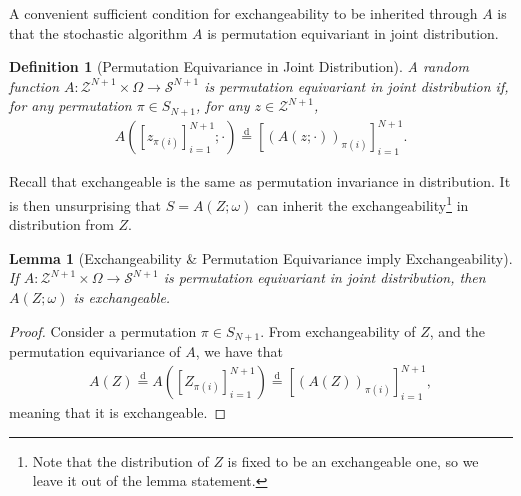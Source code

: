 \documentclass{article}
\newcommand{\oo}[1]{\left( #1 \right)}
\newcommand{\cc}[1]{\left[ #1 \right]}
\newtheorem{lemma}{Lemma}
\newtheorem{definition}{Definition}
\begin{document}
        A convenient sufficient condition for exchangeability to be inherited through $A$ is that the stochastic algorithm $A$ is permutation equivariant in joint distribution.
        \begin{definition}
            [Permutation Equivariance in Joint Distribution]
            \label{def:equivaraibt}
            A random function $A: \mathcal{Z}^{N+1} \times \Omega \to \mathcal{S}^{N+1}$ is permutation equivariant in joint distribution if, for any permutation $\pi \in S_{N+1}$, for any $z \in \mathcal{Z}^{N+1}$,
            \begin{align*}
                A\left(\left[z_{\pi(i)}\right]_{i=1}^{N+1}; \cdot\right)
                \overset{\text{d}}{=}
                \left[
                (A(z;\cdot))_{\pi(i)}
                \right]_{i=1}^{N+1}.
            \end{align*}
        \end{definition}
        Recall that exchangeable is the same as permutation invariance in distribution. It is then unsurprising that $S = A(Z;\omega)$ can inherit the exchangeability\footnote{Note that the distribution of $Z$ is fixed to be an exchangeable one, so we leave it out of the lemma statement.} in distribution from $Z$.
        \begin{lemma}
        [Exchangeability \& Permutation Equivariance imply Exchangeability]
        \label{lemma:exchange+equivariance}
            If $A: \mathcal{Z}^{N+1} \times \Omega \to \mathcal{S}^{N+1}$ is permutation equivariant in joint distribution, then $A(Z; \omega)$ is exchangeable.
        \end{lemma}
        \begin{proof}
            Consider a permutation $\pi \in S_{N+1}$. From exchangeability of $Z$, and the permutation equivariance of $A$, we have that
            \begin{align*}
                A(Z) \overset{\text{d}}{=}
                A\oo{\cc{Z_{\pi(i)}}_{i=1}^{N+1}}
                \overset{\text{d}}{=}
                \cc{\oo{A(Z)}_{\pi(i)}}_{i=1}^{N+1},
            \end{align*}
            meaning that it is exchangeable.
        \end{proof}
\end{document}

